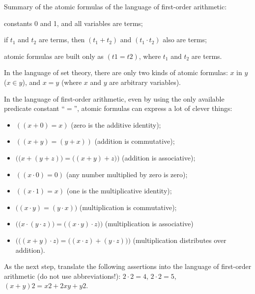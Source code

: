 \begin{ex}[]
Summary of the atomic formulas of the language of first-order arithmetic:

\begin{inparaenum}[(a)]
    \item constants 0 and 1, and all variables are terms;
    \item if \(t_1\) and \(t_2\) are terms, then \((t_1+t_2)\) and \((t_1\cdot t_2)\) also are terms;
    \item atomic formulas are built only as \((t1=t2)\), where \(t_1\) and \(t_2\) are terms.
\end{inparaenum}
\end{ex}

\begin{ex}[]
In the language of set theory, there are only two kinds of atomic formulas: \(x\) in \(y\) (\(x\in y\)), and \(x=y\) (where \(x\) and \(y\) are arbitrary variables).
\end{ex}
In the language of first-order arithmetic, even by using the only available predicate constant ``\(=\)'', atomic formulas can express a lot of clever things:

\begin{itemize}
    \item \(((x+0)=x)\) (zero is the additive identity);
    \item \(((x+y)=(y+x))\) (addition is commutative);
    \item \(\Big(\big(x+(y+z)\big)=\big((x+y)+z\big)\Big)\) (addition is associative);
    \item \(((x\cdot 0)=0)\) (any number multiplied by zero is zero);
    \item \(((x\cdot 1)=x)\) (one is the multiplicative identity);
    \item \(\big((x\cdot y)=(y\cdot x)\big)\) (multiplication is commutative);
    \item \(\Big(\big(x\cdot (y\cdot z)\big)=\big((x\cdot y)\cdot z\big)\Big)\) (multiplication is associative)
    \item \(\Big(\big((x+y)\cdot z\big)=\big((x\cdot z)+(y\cdot z)\big)\Big)\) (multiplication distributes over addition).
\end{itemize}

\begin{exer}
As the next step, translate the following assertions into the language of first-order arithmetic (do not use abbreviations!): \(2\cdot 2=4\), \(2\cdot 2=5\), \((x+y)2 = x2+2xy+y2\).
\end{exer}

